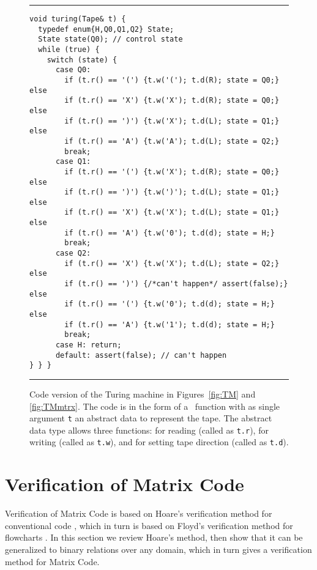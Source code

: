 \documentclass[preprint,11pt]{elsarticle}
\begin{document}
\begin{figure}[htbp]
\hrule \vspace{0.1in}
\begin{center}
\begin{minipage}[t]{5in}
{\footnotesize
\begin{verbatim}
void turing(Tape& t) {
  typedef enum{H,Q0,Q1,Q2} State;
  State state(Q0); // control state
  while (true) {
    switch (state) {
      case Q0:
        if (t.r() == '(') {t.w('('); t.d(R); state = Q0;} else
        if (t.r() == 'X') {t.w('X'); t.d(R); state = Q0;} else
        if (t.r() == ')') {t.w('X'); t.d(L); state = Q1;} else
        if (t.r() == 'A') {t.w('A'); t.d(L); state = Q2;}
        break;
      case Q1:
        if (t.r() == '(') {t.w('X'); t.d(R); state = Q0;} else
        if (t.r() == ')') {t.w(')'); t.d(L); state = Q1;} else
        if (t.r() == 'X') {t.w('X'); t.d(L); state = Q1;} else
        if (t.r() == 'A') {t.w('0'); t.d(d); state = H;}
        break;
      case Q2:
        if (t.r() == 'X') {t.w('X'); t.d(L); state = Q2;} else
        if (t.r() == ')') {/*can't happen*/ assert(false);} else
        if (t.r() == '(') {t.w('0'); t.d(d); state = H;} else
        if (t.r() == 'A') {t.w('1'); t.d(d); state = H;}
        break;
      case H: return;
      default: assert(false); // can't happen
} } }
\end{verbatim}
} \end{minipage}
\end{center}
\caption{\label{fig:TurCode}
Code version of the Turing machine in Figures~\ref{fig:TM}
and \ref{fig:TMmtrx}.
The code is in the form of a \cpp\ function with as single
argument {\tt t} an abstract data to represent the tape.
The abstract data type allows three functions:
for reading (called as {\tt t.r}),
for writing (called as {\tt t.w}),
and
for setting tape direction (called as {\tt t.d}).
}

\vspace{0.1in}
\hrule
\end{figure}

\clearpage

\section{Verification of Matrix Code}
\label{sec:floyd}

Verification of Matrix Code is based on Hoare's verification
method for conventional code \cite{hr69},
which in turn is based on Floyd's verification
method for flowcharts \cite{fld67}.
In this section we review Hoare's method,
then show that it can be generalized to binary relations
over any domain,
which in turn gives a verification method for Matrix Code.
\end{document}
